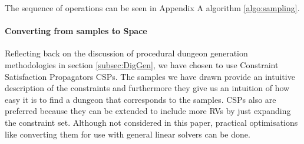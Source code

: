 \documentclass{UoYCSproject}
\begin{document}
The sequence of operations can be seen in Appendix A algorithm \ref{algo:sampling}.

\paragraph{Converting from samples to Space}
Reflecting back on the discussion of procedural dungeon generation methodologies in section \ref{subsec:DigGen}, we have chosen to use Constraint Satisfaction Propagators CSPs. The samples we have drawn provide an intuitive description of the constraints and furthermore they give us an intuition of how easy it is to find a dungeon that corresponds to the samples. CSPs also are preferred because they can be extended to include more RVs by just expanding the constraint set. Although not considered in this paper, practical optimisations like converting them for use with general linear solvers can be done.
\end{document}
